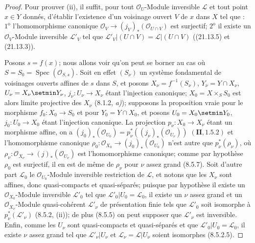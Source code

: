 \begin{proof}
Pour prouver (ii), il suffit, pour tout $\mathcal O_U$-Module inversible $\mathscr L$
et tout point $x\in Y$ donnés, d'établir l'existence d'un voisinage ouvert $V$ de $x$
dans $X$ tel que : $1^{\mathrm o}$ l'homomorphisme canonique
$\mathcal O_V\to(j_V)_*(\mathcal O_{U\cap V})$ est surjectif;
$2^{\mathrm o}$ il existe un $\mathcal O_V$-Module inversible $\mathscr L'_V$ tel que
$\mathscr L'_V|(U\cap V)=\mathscr L|(U\cap V)$ ((21.13.5) et (21.13.3)).

Posons $s=f(x)$; nous allons voir qu'on peut se borner au cas où
$S=S_0=\operatorname{Spec}(\mathcal O_{S,s})$. Soit en effet $(S_\nu)$ un système
fondamental de voisinages ouverts affines de $s$ dans $S$, et posons
$X_\nu=f^{-1}(S_\nu)$, $Y_\nu=Y\cap X_\nu$, $U_\nu=X_\nu\setmin Y_\nu$,
$j_\nu:U_\nu\to X_\nu$ étant l'injection canonique; $X_0=X\times_S S_0$ est alors
limite projective des $X_\nu$ (8.1.2, \emph{a)}); supposons la proposition vraie pour le
morphisme $f_0:X_0\to S_0$ et pour $Y_0=Y\cap X_0$, et posons $U_0=X_0\setmin Y_0$,
$j_0:U_0\to X_0$ étant l'injection canonique. La projection
$p_\nu:X_0\to X_\nu$ étant un morphisme affine, on a $(j_0)_*(\mathcal O_{U_0})=p_\nu^*((j_\nu)_*(\mathcal O_{U_\nu}))$
$(\mathbf{II}, 1.5.2)$ et l'homomorphisme canonique
$\rho_0:\mathcal O_{X_0}\to(j_0)_*(\mathcal O_{U_0})$ n'est autre que
$p_\nu^*(\rho_\nu)$, où
$\rho_\nu:\mathcal O_{X_\nu}\to(j)_*(\mathcal O_{U_\nu})$ est l'homomorphisme
canonique; comme par hypothèse $\rho_0$ est surjectif, il en est de même de $\rho_\nu$
pour $\nu$ assez
grand (8.5.7). Soit d'autre part $\mathscr L_0$ le
$\mathcal O_{U_0}$-Module inversible restriction de $\mathscr L$, et notons que les
$X_\nu$ sont affines, donc quasi-compacts et quasi-séparés; puisque par hypothèse il
existe un $\mathcal O_{X_0}$-Module inversible $\mathscr L'_0$ tel que
$\mathscr L'_0|U_0=\mathscr L_0$, il existe un $\nu$ assez grand et un
$\mathcal O_{X_\nu}$-Module quasi-cohérent $\mathscr L'_\nu$ de présentation finie
tels que $\mathscr L'_0$ soit isomorphe à $p_\nu^*(\mathscr L'_\nu)$ (8.5.2, (ii));
de plus (8.5.5) on peut supposer que $\mathscr L'_\nu$ est inversible. Enfin, comme
les $U_\nu$ sont quasi-compacts et quasi-séparés et que
$\mathscr L'_0|U_0=\mathscr L_0$, il existe $\nu$ assez grand tel que
$\mathscr L'_\nu|U_\nu$ et $\mathscr L_\nu=\mathscr L|U_\nu$ soient isomorphes (8.5.2.5).


\end{proof}
